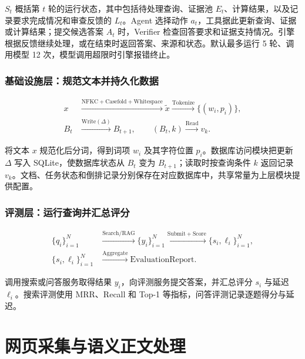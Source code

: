 \documentclass[UTF8,zihao=-4,fontset=fandol]{ctexart}
\begin{document}
$S_t$ 概括第 $t$ 轮的运行状态，其中包括待处理查询、证据池 $E_t$、计算结果，以及记录要求完成情况和审查反馈的 $L_t$。Agent 选择动作 $a_t$，工具据此更新查询、证据或计算结果；提交候选答案 $A_t$ 时，Verifier 检查回答要求和证据支持情况。引擎根据反馈继续处理，或在结束时返回答案、来源和状态。默认最多运行 5 轮、调用模型 12 次，模型调用超限时引擎报错终止。

\subsubsection*{基础设施层：规范文本并持久化数据}

\begin{equation}
\begin{aligned}
x&\xrightarrow{\mathrm{NFKC+Casefold+Whitespace}}\tilde x
\xrightarrow{\mathrm{Tokenize}}\{(w_i,p_i)\},\\
B_t&\xrightarrow{\mathrm{Write}(\Delta)}B_{t+1},
\qquad(B_t,k)\xrightarrow{\mathrm{Read}}v_k.
\end{aligned}
\label{eq:architecture-infrastructure}
\end{equation}

 将文本 $x$ 规范化后分词，得到词项 $w_i$ 及其字符位置 $p_i$。数据库访问模块把更新 $\Delta$ 写入 SQLite，使数据库状态从 $B_t$ 变为 $B_{t+1}$；读取时按查询条件 $k$ 返回记录 $v_k$。文档、任务状态和倒排记录分别保存在对应数据库中，共享常量为上层模块提供配置。

\subsubsection*{评测层：运行查询并汇总评分}

\begin{equation}
\begin{aligned}
\{q_i\}_{i=1}^{N}
&\xrightarrow{\mathrm{Search/RAG}}\{y_i\}_{i=1}^{N}
\xrightarrow{\mathrm{Submit+Score}}
\{s_i,\ell_i\}_{i=1}^{N},\\
\{s_i,\ell_i\}_{i=1}^{N}
&\xrightarrow{\mathrm{Aggregate}}\mathrm{EvaluationReport}.
\end{aligned}
\label{eq:architecture-evaluation}
\end{equation}

 调用搜索或问答服务取得结果 $y_i$，向评测服务提交答案，并汇总评分 $s_i$ 与延迟 $\ell_i$。搜索评测使用 MRR、Recall 和 Top-1 等指标，问答评测记录逐题得分与延迟。

\section{网页采集与语义正文处理}
\end{document}
